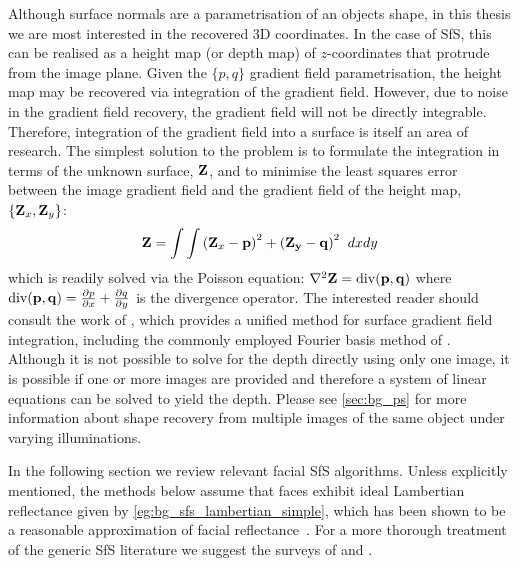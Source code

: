 Although surface normals
are a parametrisation of an objects shape, in this thesis we are most
interested in the recovered 3D coordinates. In the case of SfS, this can be
realised as a height map (or depth map) of $z$-coordinates that protrude
from the image plane. Given the $\{p, q\}$ gradient field parametrisation, the
height map may be recovered via integration of the gradient field. However,
due to noise in the gradient field recovery, the gradient field will not be
directly integrable. Therefore, integration of the gradient field into a
surface is itself an area of research. The simplest solution to the
problem is to formulate the integration in terms of the unknown surface,
$\boldsymbol{\mathbf{Z}}$, and to minimise the least squares error~\cite{horn1990height,simchony1990direct,agrawal2006range}
between the image gradient field and the gradient field of the height map,
$\{\boldsymbol{\mathbf{Z}}_x, \boldsymbol{\mathbf{Z}}_y\}$:
\begin{equation}\label{eq:bg_sfs_gradient_field_ls}
    \boldsymbol{\mathbf{Z}} = \int \int {(\boldsymbol{\mathbf{Z}}_x - \boldsymbol{\mathbf{p}})}^2 + {(\boldsymbol{\mathbf{Z_y}} - \boldsymbol{\mathbf{q}})}^2 \;\; dx dy
\end{equation}
which is readily solved via the Poisson equation:
$\nabla^2 \boldsymbol{\mathbf{Z}} = \operatorname{div}(\boldsymbol{\mathbf{p}}, \boldsymbol{\mathbf{q}})$ where
$\operatorname{div}(\boldsymbol{\mathbf{p}}, \boldsymbol{\mathbf{q}}) = \frac{\partial p}{\partial x} + \frac{\partial q}{\partial y}$
is the divergence operator. The interested reader should consult the
work of \citet{agrawal2006range}, which provides a unified method for
surface gradient field integration, including the commonly employed Fourier
basis method of \citet{frankot1988method}.
Although it is not possible to solve for the depth directly using only one
image, it is possible if one or more images are provided and therefore
a system of linear equations can be solved to yield the depth. Please see
\cref{sec:bg_ps} for more information about shape recovery from multiple
images of the same object under varying illuminations.

In the following section we review relevant facial SfS algorithms. Unless
explicitly mentioned, the methods below assume that faces exhibit ideal
Lambertian reflectance given by \cref{eg:bg_sfs_lambertian_simple},
which has been shown to be a reasonable approximation
of facial reflectance~\cite{Sirovich:1987te,georghiades2001fromfew,%
Basri:2003ie,turk1991eigenfaces,Hallinan:1994dz,ramamoorthi2002analytic,%
ramamoorthi2001relationship,shashua1997photometric,moses1993face,%
marschner1999image}. For a more
thorough treatment of the generic SfS literature we suggest the surveys
of \citet{zhang1999shape} and \citet{durou2008numerical}.

